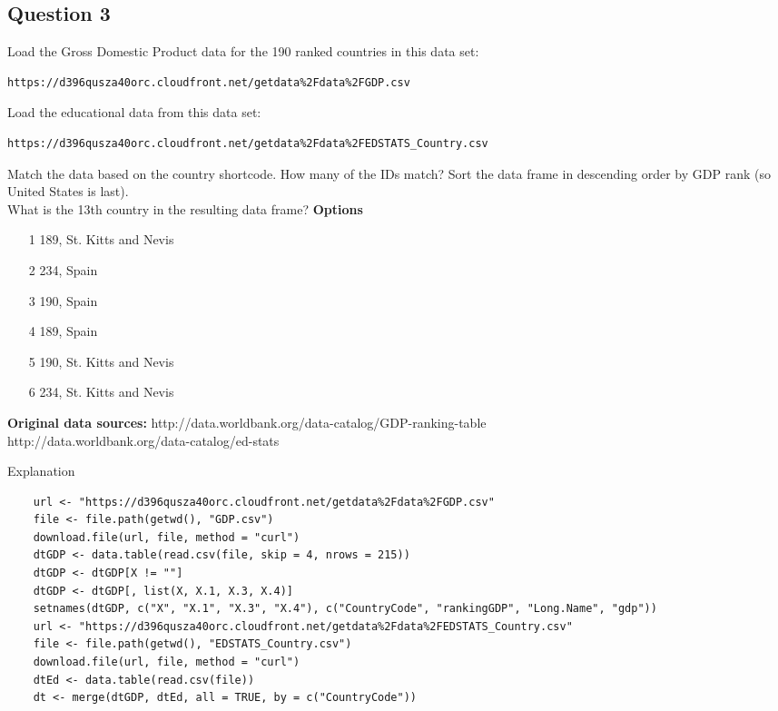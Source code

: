 \documentclass[]{article}
\begin{document}
\subsection*{Question 3}
Load the Gross Domestic Product data for the 190 ranked countries in this data set: 

\begin{verbatim}
https://d396qusza40orc.cloudfront.net/getdata%2Fdata%2FGDP.csv 
\end{verbatim}
Load the educational data from this data set: 
\begin{verbatim}
https://d396qusza40orc.cloudfront.net/getdata%2Fdata%2FEDSTATS_Country.csv 
\end{verbatim}
Match the data based on the country shortcode. How many of the IDs match? Sort the data frame in descending order by GDP rank (so United States is last). 
\\
What is the 13th country in the resulting data frame? 
\bigskip
\textbf{Options}
\begin{itemize}
\item[1] 189, St. Kitts and Nevis
\item[2] 234, Spain
\item[3] 190, Spain
\item[4] 189, Spain
\item[5] 190, St. Kitts and Nevis
\item[6] 234, St. Kitts and Nevis
\end{itemize}

\textbf{Original data sources:} 
http://data.worldbank.org/data-catalog/GDP-ranking-table \\
http://data.worldbank.org/data-catalog/ed-stats\\




\newpage

Explanation
\begin{framed}
	\begin{verbatim}
	url <- "https://d396qusza40orc.cloudfront.net/getdata%2Fdata%2FGDP.csv"
	file <- file.path(getwd(), "GDP.csv")
	download.file(url, file, method = "curl")
	dtGDP <- data.table(read.csv(file, skip = 4, nrows = 215))
	dtGDP <- dtGDP[X != ""]
	dtGDP <- dtGDP[, list(X, X.1, X.3, X.4)]
	setnames(dtGDP, c("X", "X.1", "X.3", "X.4"), c("CountryCode", "rankingGDP", "Long.Name", "gdp"))
	url <- "https://d396qusza40orc.cloudfront.net/getdata%2Fdata%2FEDSTATS_Country.csv"
	file <- file.path(getwd(), "EDSTATS_Country.csv")
	download.file(url, file, method = "curl")
	dtEd <- data.table(read.csv(file))
	dt <- merge(dtGDP, dtEd, all = TRUE, by = c("CountryCode"))
	
	\end{verbatim}
\end{framed}
\end{document}
